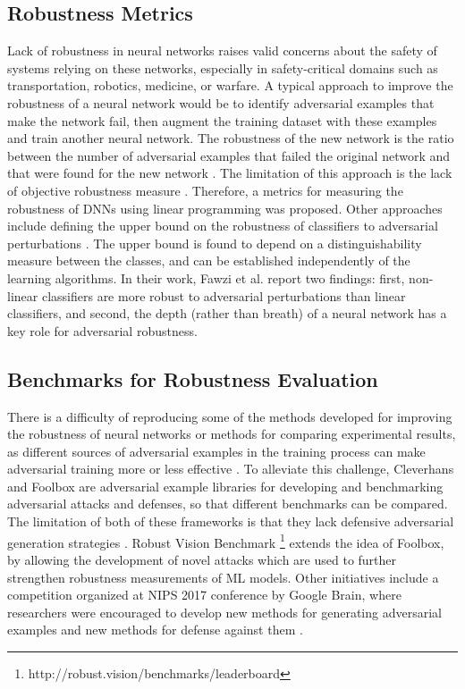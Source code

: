 \documentclass[letterpaper]{article} %
\begin{document}
\subsection{Robustness Metrics}
Lack of robustness in neural networks raises valid concerns about the safety of systems relying on these networks, especially in safety-critical domains such as transportation, robotics, medicine, or warfare. A typical approach to improve the robustness of a neural network would be to identify adversarial examples that make the network fail, then augment the training dataset with these examples and train another neural network. The robustness of the new network is the ratio between the number of adversarial examples that failed the original network and that were found for the new network \cite{Goodfellow2015}. The limitation of this approach is the lack of objective robustness measure \cite{Bastani2016}. Therefore, a metrics for measuring the robustness of DNNs using linear programming \cite{Bastani2016} was proposed. Other approaches include defining the upper bound on the robustness of classifiers to adversarial perturbations \cite{Fawzi2018}. The upper bound is found to depend on a distinguishability measure between the classes, and can be established independently of the learning algorithms. In their work, Fawzi et al. report two findings: first, non-linear classifiers are more robust to adversarial perturbations than linear classifiers, and second, the depth (rather than breath) of a neural network has a key role for adversarial robustness.

\subsection{Benchmarks for Robustness Evaluation}
There is a difficulty of reproducing some of the methods developed for improving the robustness of neural networks or methods for comparing experimental results, as different sources of adversarial examples in the training process can make adversarial training more or less effective \cite{Goodfellow2016}. To alleviate this challenge, Cleverhans \cite{Goodfellow2016} and Foolbox \cite{Rauber2017} are adversarial example libraries for developing and benchmarking adversarial attacks and defenses, so that different benchmarks can be compared. The limitation of both of these frameworks is that they lack defensive adversarial generation strategies \cite{Yuan2019}. Robust Vision Benchmark \footnote{http://robust.vision/benchmarks/leaderboard} extends the idea of Foolbox, by allowing the development of novel attacks which are used to further strengthen robustness measurements of ML models. Other initiatives include a competition organized at NIPS 2017 conference by Google Brain, where researchers were encouraged to develop new methods for generating adversarial examples and new methods for defense against them \cite{Kurakin2018}.
\end{document}
